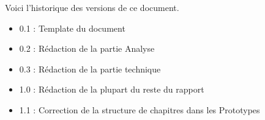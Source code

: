 Voici l’historique des versions de ce document.

\begin{itemize}
	\item 0.1 : Template du document
	\item 0.2 : Rédaction de la partie Analyse
	\item 0.3 : Rédaction de la partie technique
	\item 1.0 : Rédaction de la plupart du reste du rapport
	\item 1.1 : Correction de la structure de chapitres dans les Prototypes
\end{itemize}